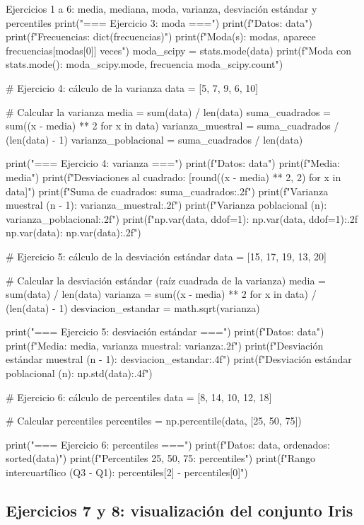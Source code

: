 \documentclass[11pt,letterpaper]{article}
\begin{document}
\begin{codigo}[label=cod:ej16]{Ejercicios 1 a 6: media, mediana, moda, varianza, desviación estándar y percentiles}
print("\n=== Ejercicio 3: moda ===")
print(f"Datos: {data}")
print(f"Frecuencias: {dict(frecuencias)}")
print(f"Moda(s): {modas}, aparece {frecuencias[modas[0]]} veces")
moda_scipy = stats.mode(data)
print(f"Moda con stats.mode(): {moda_scipy.mode}, frecuencia {moda_scipy.count}")

# Ejercicio 4: cálculo de la varianza
data = [5, 7, 9, 6, 10]

# Calcular la varianza
media = sum(data) / len(data)
suma_cuadrados = sum((x - media) ** 2 for x in data)
varianza_muestral = suma_cuadrados / (len(data) - 1)
varianza_poblacional = suma_cuadrados / len(data)

print("\n=== Ejercicio 4: varianza ===")
print(f"Datos: {data}")
print(f"Media: {media}")
print(f"Desviaciones al cuadrado: {[round((x - media) ** 2, 2) for x in data]}")
print(f"Suma de cuadrados: {suma_cuadrados:.2f}")
print(f"Varianza muestral (n - 1): {varianza_muestral:.2f}")
print(f"Varianza poblacional (n):  {varianza_poblacional:.2f}")
print(f"np.var(data, ddof=1): {np.var(data, ddof=1):.2f}   np.var(data): {np.var(data):.2f}")

# Ejercicio 5: cálculo de la desviación estándar
data = [15, 17, 19, 13, 20]

# Calcular la desviación estándar (raíz cuadrada de la varianza)
media = sum(data) / len(data)
varianza = sum((x - media) ** 2 for x in data) / (len(data) - 1)
desviacion_estandar = math.sqrt(varianza)

print("\n=== Ejercicio 5: desviación estándar ===")
print(f"Datos: {data}")
print(f"Media: {media}, varianza muestral: {varianza:.2f}")
print(f"Desviación estándar muestral (n - 1): {desviacion_estandar:.4f}")
print(f"Desviación estándar poblacional (n):  {np.std(data):.4f}")

# Ejercicio 6: cálculo de percentiles
data = [8, 14, 10, 12, 18]

# Calcular percentiles
percentiles = np.percentile(data, [25, 50, 75])

print("\n=== Ejercicio 6: percentiles ===")
print(f"Datos: {data}, ordenados: {sorted(data)}")
print(f"Percentiles 25, 50, 75: {percentiles}")
print(f"Rango intercuartílico (Q3 - Q1): {percentiles[2] - percentiles[0]}")
\end{codigo}

\subsection{Ejercicios 7 y 8: visualización del conjunto Iris}
\end{document}
